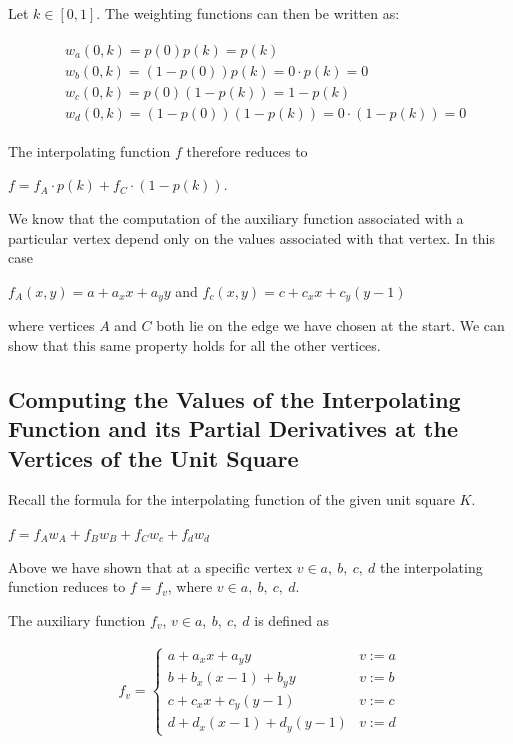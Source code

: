 \documentclass[fleqn]{article}
\begin{document}
\pagebreak
Let $k \in [0, 1]$. The weighting functions can then be written as:

\begin{align}
\begin{split}
& w_{a}(0, k) = p(0)p(k) = p(k)\\
& w_{b}(0, k) = (1 - p(0))p(k) = 0 \cdot p(k) = 0 \\
& w_{c}(0, k) = p(0)(1 - p(k)) = 1 - p(k) \\
& w_{d}(0, k) = (1 - p(0))(1 - p(k)) = 0 \cdot (1 - p(k)) = 0
\end{split}
\end{align}

The interpolating function $f$ therefore reduces to

$f = f_{A} \cdot p(k) + f_{C} \cdot (1 - p(k))$.

We know that the computation of the auxiliary function associated with a particular vertex depend only on the values associated with that vertex. In this case

$f_{A}(x, y) = a + a_{x}x + a_{y}y$ and $f_{c}(x, y) = c + c_{x}x + c_{y}(y - 1)$

where vertices $A$ and $C$ both lie on the edge we have chosen at the start. We can show that this same property holds for all the other vertices.

\subsection{Computing the Values of the Interpolating Function and its Partial Derivatives at the Vertices of the Unit Square}

Recall the formula for the interpolating function of the given unit square $K$.

$f = f_{A}w_{A} + f_{B}w_{B} + f_{C}w_{c} + f_{d}w_{d}$

Above we have shown that at a specific vertex $v \in {a, \ b, \ c, \ d}$ the interpolating function reduces to $f = f_{v}$, where $v \in {a, \ b, \ c, \ d}$.

The auxiliary function $f_{v}$, $v \in {a, \ b, \ c, \ d}$ is defined as

\begin{align*}
f_{v} = 
\begin{cases} 
      a + a_{x}x + a_{y}y & v := a \\
      b + b_{x}(x - 1) + b_{y}y & v := b \\
      c + c_{x}x + c_{y}(y - 1) & v := c \\
      d + d_{x}(x - 1) + d_{y}(y - 1) & v := d
\end{cases}
\end{align*}
\end{document}
